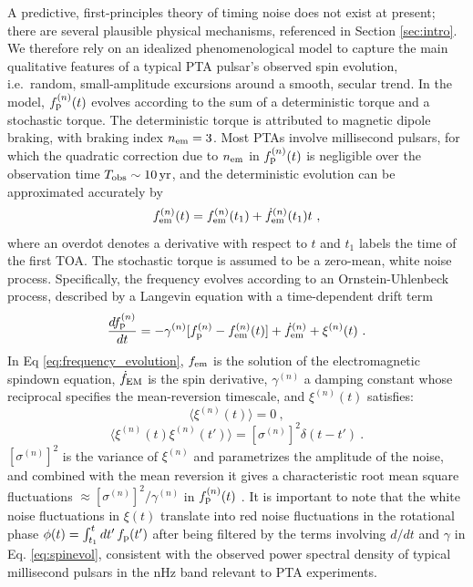 \documentclass[fleqn,usenatbib,useAMS]{mnras}
\begin{document}
A predictive, first-principles theory of timing noise does not exist at present; there are several plausible physical mechanisms, referenced in Section \ref{sec:intro}. We therefore rely on an idealized phenomenological model to capture the main qualitative features of a typical PTA pulsar's observed spin evolution, i.e.\ random, small-amplitude excursions around a smooth, secular trend. In the model, $f_{\rm p}^{(n)}(t)$ evolves according to the sum of a deterministic torque and a stochastic torque. The deterministic torque is attributed to magnetic dipole braking, with braking index $n_{\rm em}=3$. Most PTAs involve millisecond pulsars, for which the quadratic correction due to $n_{\rm em}$ in $f_{\rm p}^{(n)}(t)$ is negligible over the observation time $T_{\rm obs} \sim 10 \, {\rm yr}$, and the deterministic evolution can be approximated accurately by 
\begin{equation}
 f_{\rm em}^{(n)}(t) = f_{\rm em}^{(n)}(t_1) + \dot{f}_{\rm em}^{(n)}(t_1)t \ , \label{eq:spinevol}
\end{equation} where an overdot denotes a derivative with respect to $t$ and $t_1$ labels the time of the first TOA. The stochastic torque is assumed to be a zero-mean, white noise process. Specifically, the frequency evolves according to an Ornstein-Uhlenbeck process, described by a Langevin equation with a time-dependent drift term \citep{Vargas}
\begin{equation}
	\frac{df_{\rm p}^{(n)}}{dt} = -\gamma^{(n)}	 [f_{\rm p}^{(n)} - f_{\rm em}^{(n)} (t)] + \dot{f}_{\rm em}^{(n)} +\xi^{(n)}(t) \ . 
	\label{eq:frequency_evolution}
\end{equation}
In Eq \ref{eq:frequency_evolution}, $f_{\rm em}$ is the solution of the electromagnetic spindown equation, $\dot{f}_{\rm EM}$ is the spin derivative, $\gamma^{(n)}$ a damping constant whose reciprocal specifies the mean-reversion timescale, and $\xi^{(n)}(t)$ satisfies:
\begin{equation}
	\langle \xi^{(n)}(t) \rangle = 0 \ ,
\end{equation}
\begin{equation}
	\langle \xi^{(n)}(t) \xi^{(n)}(t') \rangle = [\sigma^{(n)}]^2 \delta(t - t') \ .
	\label{eq:xieqn}
\end{equation}
$[\sigma^{(n)}]^2$ is the variance of $\xi^{(n)}$ and parametrizes the amplitude of the noise, and combined with the mean reversion it gives a characteristic root mean square fluctuations $\approx [\sigma^{(n)}]^2 / \gamma^{(n)}$ in $f_{\rm p}^{(n)}(t)$ \citep{gardiner2009stochastic}. It is important to note that the white noise fluctuations in $\xi(t)$ translate into red noise fluctuations in the rotational phase $\phi(t) = \int_{t_1}^t dt' \, f_{\rm p}(t')$ after being filtered by the terms involving $d/dt$ and $\gamma$ in Eq. \ref{eq:spinevol}, consistent with the observed power spectral density of typical millisecond pulsars in the nHz band relevant to PTA experiments. \newline 
\end{document}
